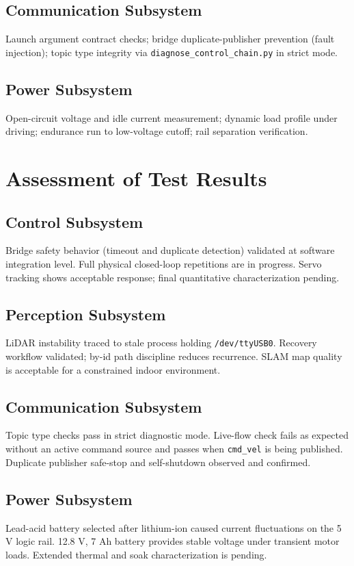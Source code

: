 \documentclass[12pt,a4paper]{report}
\begin{document}
\subsection{Communication Subsystem}
Launch argument contract checks; bridge duplicate-publisher prevention (fault injection); topic type integrity via \texttt{diagnose\_control\_chain.py} in strict mode.

\subsection{Power Subsystem}
Open-circuit voltage and idle current measurement; dynamic load profile under driving; endurance run to low-voltage cutoff; rail separation verification.

\section{Assessment of Test Results}

\subsection{Control Subsystem}
Bridge safety behavior (timeout and duplicate detection) validated at software integration level. Full physical closed-loop repetitions are in progress. Servo tracking shows acceptable response; final quantitative characterization pending.

\subsection{Perception Subsystem}
LiDAR instability traced to stale process holding \texttt{/dev/ttyUSB0}. Recovery workflow validated; by-id path discipline reduces recurrence. SLAM map quality is acceptable for a constrained indoor environment.

\subsection{Communication Subsystem}
Topic type checks pass in strict diagnostic mode. Live-flow check fails as expected without an active command source and passes when \texttt{cmd\_vel} is being published. Duplicate publisher safe-stop and self-shutdown observed and confirmed.

\subsection{Power Subsystem}
Lead-acid battery selected after lithium-ion caused current fluctuations on the 5 V logic rail. 12.8 V, 7 Ah battery provides stable voltage under transient motor loads. Extended thermal and soak characterization is pending.
\end{document}
